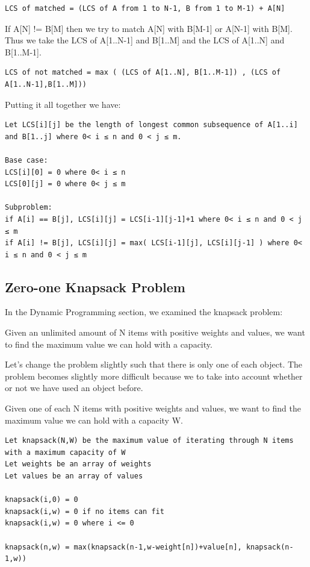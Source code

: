 \documentclass[11pt,oneside]{book}
\begin{document}
\begin{lstlisting}
LCS of matched = (LCS of A from 1 to N-1, B from 1 to M-1) + A[N]
\end{lstlisting}

If A[N] != B[M] then we try to match A[N] with B[M-1] or A[N-1] with B[M]. Thus we take the LCS of A[1..N-1] and B[1..M] and the LCS of A[1..N] and B[1..M-1].

\begin{lstlisting}
LCS of not matched = max ( (LCS of A[1..N], B[1..M-1]) , (LCS of A[1..N-1],B[1..M]))
\end{lstlisting}

Putting it all together we have:

\begin{lstlisting}
Let LCS[i][j] be the length of longest common subsequence of A[1..i] and B[1..j] where 0< i ≤ n and 0 < j ≤ m.

Base case:
LCS[i][0] = 0 where 0< i ≤ n
LCS[0][j] = 0 where 0< j ≤ m

Subproblem:
if A[i] == B[j], LCS[i][j] = LCS[i-1][j-1]+1 where 0< i ≤ n and 0 < j ≤ m
if A[i] != B[j], LCS[i][j] = max( LCS[i-1][j], LCS[i][j-1] ) where 0< i ≤ n and 0 < j ≤ m
\end{lstlisting}

\subsection{Zero-one Knapsack Problem}

In the Dynamic Programming section, we examined the knapsack problem:

Given an unlimited amount of N items with positive weights and values, we want to find the maximum value we can hold with a capacity.

Let's change the problem slightly such that there is only one of each object. The problem becomes slightly more difficult because we to take into account whether or not we have used an object before.

Given one of each N items with positive weights and values, we want to find the maximum value we can hold with a capacity W.

\begin{lstlisting}
Let knapsack(N,W) be the maximum value of iterating through N items with a maximum capacity of W
Let weights be an array of weights
Let values be an array of values

knapsack(i,0) = 0
knapsack(i,w) = 0 if no items can fit
knapsack(i,w) = 0 where i <= 0

knapsack(n,w) = max(knapsack(n-1,w-weight[n])+value[n], knapsack(n-1,w))
\end{lstlisting}
\end{document}
